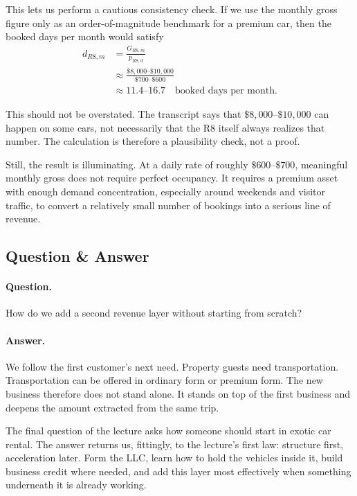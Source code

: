 This lets us perform a cautious consistency check. If we use the monthly gross figure only as an order-of-magnitude benchmark for a premium car, then the booked days per month would satisfy
\begin{align}
d_{R8,m}
&= \frac{G_{R8,m}}{p_{R8,d}} \\
&\approx \frac{\$8{,}000\text{--}\$10{,}000}{\$700\text{--}\$600} \\
&\approx 11.4\text{--}16.7
\quad
\text{booked days per month}.
\end{align}

\begin{remark}
This should not be overstated. The transcript says that \(\$8{,}000\text{--}\$10{,}000\) can happen on some cars, not necessarily that the R8 itself always realizes that number. The calculation is therefore a plausibility check, not a proof.
\end{remark}

Still, the result is illuminating. At a daily rate of roughly \(\$600\text{--}\$700\), meaningful monthly gross does not require perfect occupancy. It requires a premium asset with enough demand concentration, especially around weekends and visitor traffic, to convert a relatively small number of bookings into a serious line of revenue.

\subsection{Question \& Answer}

\paragraph{Question.}
How do we add a second revenue layer without starting from scratch?

\paragraph{Answer.}
We follow the first customer's next need. Property guests need transportation. Transportation can be offered in ordinary form or premium form. The new business therefore does not stand alone. It stands on top of the first business and deepens the amount extracted from the same trip.

The final question of the lecture asks how someone should start in exotic car rental. The answer returns us, fittingly, to the lecture's first law: structure first, acceleration later. Form the LLC, learn how to hold the vehicles inside it, build business credit where needed, and add this layer most effectively when something underneath it is already working.

